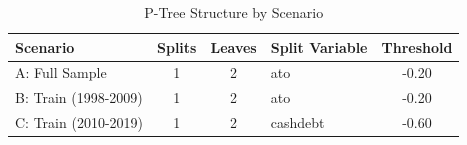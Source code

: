 \begin{table}[!ht]
\centering
\caption{P-Tree Structure by Scenario}
\label{tab:tree_structure}
\begin{tabular}{l c c l c}
\hline
Scenario & Splits & Leaves & Split Variable & Threshold \\
\hline
A: Full Sample & 1 & 2 & ato & -0.20 \\
B: Train (1998-2009) & 1 & 2 & ato & -0.20 \\
C: Train (2010-2019) & 1 & 2 & cashdebt & -0.60 \\
\hline
\end{tabular}
\end{table}
